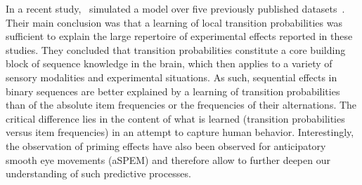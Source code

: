 \documentclass[12pt,english]{article}%
\newcommand{\citep}[1]{\parencite{#1}}
\newcommand{\citet}[1]{\textcite{#1}}
\begin{document}
In a recent study,~\citet{Meyniel16} simulated a model
over five previously published datasets~\citep{Squires1976, Huettel2002, Kolossa2013, Cho2002, Falk1997}.
Their main conclusion was that
a learning of local transition probabilities
was sufficient to explain the large repertoire
of experimental effects reported in these studies.
They concluded that transition probabilities constitute
a core building block of sequence knowledge in the brain,
which then applies to a variety of sensory modalities and
experimental situations.
As such, sequential effects in binary sequences are better explained
by a learning of transition probabilities
than of the absolute item frequencies or the frequencies of their alternations.
The critical difference lies in the content
of what is learned (transition probabilities versus item frequencies)
in an attempt to capture human behavior.
Interestingly, the observation of priming effects
have also been observed for anticipatory smooth eye movements (aSPEM)
and therefore allow to further deepen our understanding of such predictive processes. %

\end{document}
